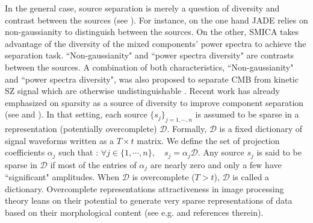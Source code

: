 In the general case, source separation is merely a question of diversity and contrast between the sources (see \cite{Cardo1}). 
For instance, on the one hand JADE relies on non-gaussianity to distinguish between the sources. On the other, SMICA takes advantage 
of the diversity of the mixed components' power spectra to achieve the separation task. ``Non-gaussianity" and ``power spectra diversity" 
are contrasts between the sources. A combination of both characteristics, ``Non-gaussianity" and ``power spectra diversity", 
was also proposed to separate CMB from kinetic SZ signal which are otherwise undistinguishable \cite{forni}. Recent work has 
already emphasized on sparsity as a source of diversity to improve component separation (see \cite{Zibu} and \cite{MMCA}). 
In that setting, each source $\{s_j\}_{j=1,\cdots,n}$ is assumed to be sparse in a representation (potentially overcomplete) $\mathcal{D}$. 
Formally, $\mathcal{D}$ is a fixed dictionary of signal waveforms written as a $T \times t$ matrix. We define the set of projection 
coefficients $\alpha_j$ such that : $\forall j \in \{1,\cdots,n\}, \quad s_j = \alpha_j \mathcal{D}$. Any source $s_j$ is said 
to be sparse in $\mathcal{D}$ if most of the entries of $\alpha_j$ are nearly zero and only a few have ``significant" amplitudes. 
When $\mathcal{D}$ is overcomplete ($T > t$), $\mathcal{D}$ is called a dictionary. Overcomplete representations attractiveness 
in image processing theory leans on their potential to generate very sparse representations of data based on their morphological 
content (see e.g. \cite{DH} and references therein).

